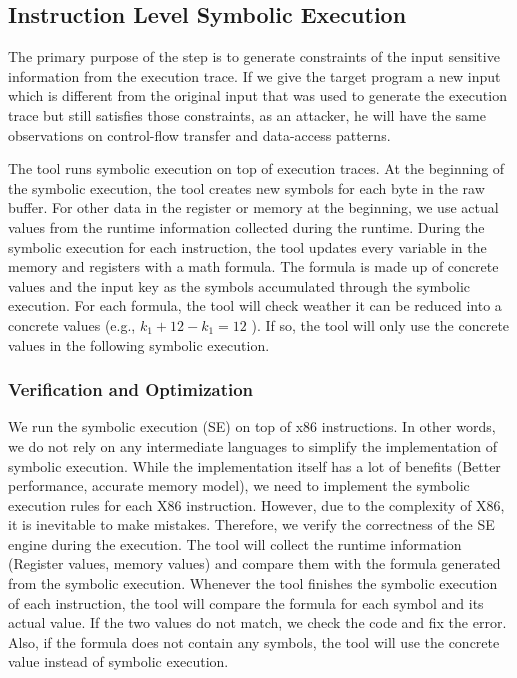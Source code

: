 \subsection{Instruction Level Symbolic Execution}
\label{InstructionSE}
The primary purpose of the step is to generate constraints of the input 
sensitive information from the execution trace. 
If we give the target program a new input which 
is different from the original input that was used 
to generate the execution trace but still satisfies those constraints,
as an attacker, he will have the same observations on
control-flow transfer and 
data-access patterns.

The tool runs symbolic execution on top of execution traces.
At the beginning of the symbolic execution, the tool creates new 
symbols for each byte in the raw buffer. For other data in the 
register or memory at the beginning, we use actual values from the 
runtime information collected during the runtime. 
During the symbolic execution for each instruction, 
the tool updates every variable in the memory and registers with a
math formula. The formula is made up of concrete values and the input 
key as the symbols accumulated through the symbolic execution.
For each formula, the tool will check weather it can be reduced
into a concrete values (e.g., $k_1+12-k_1 = 12$ ). 
If so, the tool will only use the concrete values in the 
following symbolic execution.

\subsubsection{Verification and Optimization}
We run the symbolic execution (SE) on top of x86 instructions.
In other words, we do not rely on any intermediate languages to simplify the implementation of symbolic execution. 
While the implementation itself has a lot of benefits (Better performance, accurate memory model), 
we need to implement the symbolic execution rules for each X86 instruction. 
However, due to the complexity of X86, it is inevitable to make mistakes. 
Therefore, we verify the correctness of the SE engine during the execution. 
The tool will collect the runtime information (Register values, 
memory values) and compare them with the formula generated from the symbolic execution. Whenever the tool finishes the symbolic execution of each instruction, the tool will compare the formula for each symbol and its actual value. If the two values do not match, we check the code
and fix the error. Also, if the formula does not contain any symbols,
the tool will use the concrete value instead of symbolic execution.

